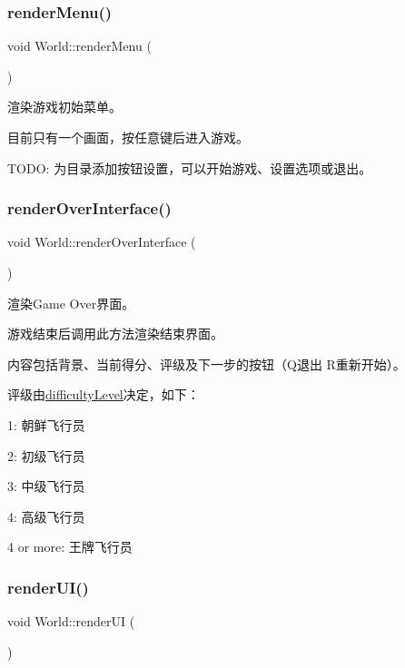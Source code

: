 \subsubsection{\texorpdfstring{render\+Menu()}{renderMenu()}}
{\footnotesize\ttfamily void World\+::render\+Menu (\begin{DoxyParamCaption}{ }\end{DoxyParamCaption})}



渲染游戏初始菜单。 

目前只有一个画面，按任意键后进入游戏。

T\+O\+DO\+: 为目录添加按钮设置，可以开始游戏、设置选项或退出。 \mbox{\label{class_world_ae265f543993824e9cca76eef29e375cb}} 
\subsubsection{\texorpdfstring{render\+Over\+Interface()}{renderOverInterface()}}
{\footnotesize\ttfamily void World\+::render\+Over\+Interface (\begin{DoxyParamCaption}{ }\end{DoxyParamCaption})}



渲染\+Game Over界面。 

游戏结束后调用此方法渲染结束界面。

内容包括背景、当前得分、评级及下一步的按钮（\+Q退出 R重新开始）。

评级由\hyperlink{class_world_a594e81a86f319eea4e8e5a2029cdaa90}{difficulty\+Level}决定，如下：
\begin{DoxyItemize}
\item 1\+: 朝鲜飞行员
\item 2\+: 初级飞行员
\item 3\+: 中级飞行员
\item 4\+: 高级飞行员
\item 4 or more\+: 王牌飞行员 
\end{DoxyItemize}\mbox{\label{class_world_a96d63470a94d9ab0426db992981b5ce5}} 
\subsubsection{\texorpdfstring{render\+U\+I()}{renderUI()}}
{\footnotesize\ttfamily void World\+::render\+UI (\begin{DoxyParamCaption}{ }\end{DoxyParamCaption})\hspace{0.3cm}{\ttfamily [private]}}



